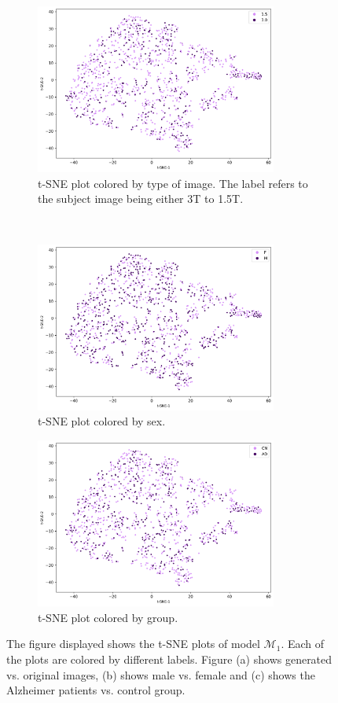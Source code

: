 \documentclass[11pt, fleqn, titlepage]{article}
\newcommand{\1}[1]{\mathds{1}\left[#1\right]}
\begin{document}
\begin{figure}[H]
	\centering
	\begin{subfigure}[t]{0.62\textwidth}
		\centering
		\includegraphics[height=2.2in]{imgs/classifier/not_generated_imgs_tsne_type}%
		\caption{t-SNE plot colored by type of image. The label refers to the subject image being either 3T to 1.5T.}
	\end{subfigure}%
	~
	\begin{subfigure}[t]{0.5\textwidth}
		\centering
		\includegraphics[height=2.2in]{imgs/classifier/not_generated_imgs_tsne_sex}%
		\caption{t-SNE plot colored by sex.}	
	\end{subfigure}
	\begin{subfigure}[t]{0.5\textwidth}
		\centering
		\includegraphics[height=2.2in]{imgs/classifier/not_generated_imgs_tsne_group}%
		\caption{t-SNE plot colored by group.}
	\end{subfigure}
	
	\caption{The figure displayed shows the t-SNE plots of model $ \mathcal M_1 $. Each of the plots are colored by different labels. Figure (a) shows generated vs. original images, (b) shows male vs. female and (c) shows the Alzheimer patients vs. control group. }
	\label{fig:tsne_not_gen}
\end{figure}
\end{document}
